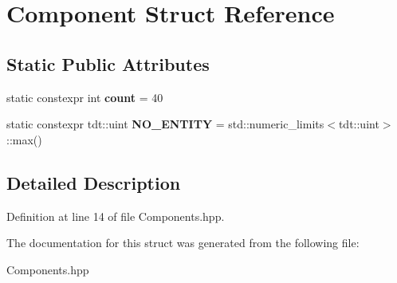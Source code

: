 \hypertarget{struct_component}{}\section{Component Struct Reference}
\label{struct_component}
\subsection*{Static Public Attributes}
\begin{DoxyCompactItemize}
\item 
static constexpr int {\bfseries count} = 40\hypertarget{struct_component_a7e29afef09bce55884b1c506b392fc0b}{}\label{struct_component_a7e29afef09bce55884b1c506b392fc0b}

\item 
static constexpr tdt\+::uint {\bfseries N\+O\+\_\+\+E\+N\+T\+I\+TY} = std\+::numeric\+\_\+limits$<$tdt\+::uint$>$\+::max()\hypertarget{struct_component_a17b8ecc16070d7cac5c78f4e1c3e0ee4}{}\label{struct_component_a17b8ecc16070d7cac5c78f4e1c3e0ee4}

\end{DoxyCompactItemize}


\subsection{Detailed Description}


Definition at line 14 of file Components.\+hpp.



The documentation for this struct was generated from the following file\+:\begin{DoxyCompactItemize}
\item 
Components.\+hpp\end{DoxyCompactItemize}
